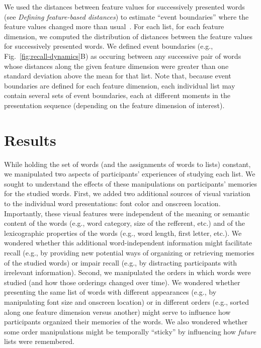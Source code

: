 \documentclass[11pt]{article}
\begin{document}
We used the distances between feature values for successively presented words
(see \textit{Defining feature-based distances}) to estimate ``event
boundaries'' where the feature values changed more than
usual~\citep{EzzyDava11, MannEtal16,RadvCope06, SwalEtal09, SwalEtal11,
DuBrDava16}. For each list, for each feature dimension, we computed the
distribution of distances between the feature values for successively presented
words. We defined event boundaries (e.g., Fig.~\ref{fig:recall-dynamics}B) as
occuring between any successive pair of words whose distances along the given
feature dimension were greater than one standard deviation above the mean for
that list. Note that, because event boundaries are defined for each feature
dimension, each individual list may contain several sets of event boundaries,
each at different moments in the presentation sequence (depending on the
feature dimension of interest).

\section*{Results}

While holding the set of words (and the assignments of words to lists)
constant, we manipulated two aspects of participants' experiences of studying
each list. We sought to understand the effects of these manipulations on
participants' memories for the studied words. First, we added two additional
sources of visual variation to the individual word presentations: font color
and onscreen location. Importantly, these visual features were independent of
the meaning or semantic content of the words (e.g., word category, size of the
refferent, etc.) and of the lexicographic properties of the words (e.g., word length,
first letter, etc.). We wondered whether this additional word-independent information
might facilitate recall (e.g., by providing new potential ways of organizing or
retrieving memories of the studied words) or impair recall (e.g., by
distracting participants with irrelevant information). Second, we manipulated
the orders in which words were studied (and how those orderings changed over
time). We wondered whether presenting the same list of words with different
appearances (e.g., by manipulating font size and onscreen location) or in
different orders (e.g., sorted along one feature dimension versus another)
might serve to influence how participants organized their memories of the
words. We also wondered whether some order manipulations might be temporally
``sticky'' by influencing how \textit{future} lists were remembered.
\end{document}
